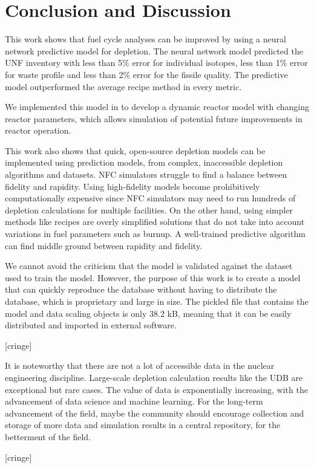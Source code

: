 \section{Conclusion and Discussion}
This work shows that fuel cycle analyses can be improved
by using a neural network predictive model for depletion.
The neural network model predicted the \gls{UNF} inventory
with less than 5\% error for individual isotopes,
less than 1\% error for waste profile 
and less than 2\% error for the fissile quality.
The predictive model outperformed the average recipe
method in every metric.

We implemented this model in \Cyclus to develop a
dynamic reactor model with changing reactor parameters,
which allows simulation of potential future improvements
in reactor operation.

This work also shows that quick, open-source depletion models
can be implemented using prediction models, from
complex, inaccessible depletion algorithms and
datasets. \gls{NFC} simulators struggle to find a balance
between fidelity and rapidity. Using high-fidelity
models become prohibitively computationally expensive
since \gls{NFC} simulators may need to run
hundreds of depletion calculations for multiple
facilities. On the other hand, using simpler methods
like recipes are overly simplified solutions
that do not take into account variations in fuel
parameters such as burnup.
A well-trained predictive algorithm can find middle
ground between rapidity and fidelity.

We cannot avoid the criticism that the model is validated
against the dataset used to train the model. However, the purpose
of this work is to create a model that can quickly reproduce the
database without having to distribute the database, which is proprietary
and large in size. The pickled file that contains
the model and data scaling objects is only 38.2 kB, meaning that it
can be easily distributed and imported in external software.

[cringe]

It is noteworthy that there are not a lot of accessible data in the
nuclear engineering discipline. Large-scale depletion
calculation results like the \gls{UDB} are exceptional
but rare cases. The value of data is exponentially increasing,
with the advancement of data science and machine learning.
For the long-term advancement of the field, maybe the
community should encourage collection and storage of more
data and simulation results in
a central repository, for the betterment of the field.

[cringe]

